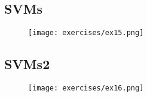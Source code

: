 \subsection{SVMs}
\begin{figure}[H]
    \centering
    \texttt{[image: exercises/ex15.png]}
\end{figure}

\subsection{SVMs2}
\begin{figure}[H]
    \centering
    \texttt{[image: exercises/ex16.png]}
\end{figure}

